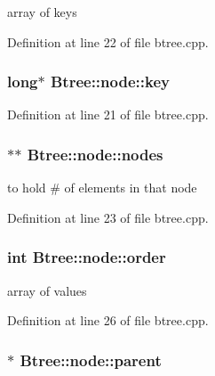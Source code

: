 array of keys 



Definition at line 22 of file btree.\-cpp.

\hypertarget{class_btree_1_1node_aa1da48fc5e2b8203ae262525c480befa}{
\subsubsection[{key}]{\setlength{\rightskip}{0pt plus 5cm}long$\ast$ Btree\-::node\-::key}}\label{class_btree_1_1node_aa1da48fc5e2b8203ae262525c480befa}


Definition at line 21 of file btree.\-cpp.

\hypertarget{class_btree_1_1node_a289484989ca45bfb92c18040556b42f8}{
\subsubsection[{nodes}]{$\ast$$\ast$ Btree\-::node\-::nodes}}\label{class_btree_1_1node_a289484989ca45bfb92c18040556b42f8}


to hold \# of elements in that node 



Definition at line 23 of file btree.\-cpp.

\hypertarget{class_btree_1_1node_a8a5ff91fd8e251549f3e2c70c04765b7}{
\subsubsection[{order}]{\setlength{\rightskip}{0pt plus 5cm}int Btree\-::node\-::order}}\label{class_btree_1_1node_a8a5ff91fd8e251549f3e2c70c04765b7}


array of values 



Definition at line 26 of file btree.\-cpp.

\hypertarget{class_btree_1_1node_a0e7ad88a4ae04f8750d3590783cda080}{
\subsubsection[{parent}]{$\ast$ Btree\-::node\-::parent}}\label{class_btree_1_1node_a0e7ad88a4ae04f8750d3590783cda080}


